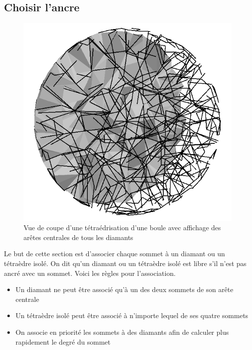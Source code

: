 \subsection{Choisir l'ancre}
\label{ancrage}
\noindent
\begin{figure}[H]
\begin{center}
\includegraphics[scale=0.2]{../Images/central_edges}
\caption{Vue de coupe d'une tétraédrisation d'une boule avec affichage des arêtes centrales de tous les diamants}
\label{fig:central_edges}
\end{center}
\end{figure}
\noindent
Le but de cette section est d'associer chaque sommet à un diamant ou un tétraèdre isolé. On dit qu'un diamant ou un tétraèdre isolé est libre s'il n'est pas ancré avec un sommet. Voici les règles pour l'association.\\
\begin{itemize}
\item Un diamant ne peut être associé qu'à un des deux sommets de son arête centrale
\item Un tétraèdre isolé peut être associé à n'importe lequel de ses quatre sommets
\item On associe en priorité les sommets à des diamants afin de calculer plus rapidement le degré du sommet\\
\end{itemize}

